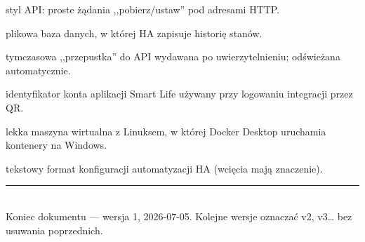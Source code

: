 \documentclass[11pt,a4paper]{article}
\begin{document}
\begin{description}[style=nextline,itemsep=1pt]
\item[REST] styl API: proste żądania ,,pobierz/ustaw'' pod adresami HTTP.
\item[SQLite] plikowa baza danych, w której HA zapisuje historię stanów.
\item[Token] tymczasowa ,,przepustka'' do API wydawana po uwierzytelnieniu; odświeżana automatycznie.
\item[User Code (kod użytkownika)] identyfikator konta aplikacji Smart Life używany przy logowaniu integracji przez QR.
\item[WSL2] lekka maszyna wirtualna z Linuksem, w której Docker Desktop uruchamia kontenery na Windows.
\item[YAML] tekstowy format konfiguracji automatyzacji HA (wcięcia mają znaczenie).
\end{description}

\vspace{8pt}
\begin{center}
\textcolor{navy}{\rule{0.6\textwidth}{0.4pt}}\\[4pt]
{\small Koniec dokumentu --- wersja 1, 2026-07-05. Kolejne wersje oznaczać v2, v3\ldots{} bez usuwania poprzednich.}
\end{center}
\end{document}
